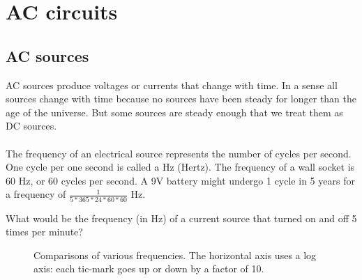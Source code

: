 \chapter{AC circuits}

\section{AC sources}
AC sources produce voltages or currents that change with time. In a sense all sources change with time because no sources have been steady for longer than the age of the universe. But some sources are steady enough that we treat them as DC sources.\\
\\
The frequency of an electrical source represents the number of cycles per second. One cycle per one second is called a Hz (Hertz). The frequency of a wall socket is 60 Hz, or 60 cycles per second. A 9V battery might undergo 1 cycle in 5 years for a frequency of $\frac{1}{5*365*24*60*60}$ Hz. \\

\begin{alevel}
What would be the frequency (in Hz) of a current source that turned on and off 5 times per minute?
\end{alevel}

\begin{figure}[H]
\begin{center}
\caption{Comparisons of various frequencies. The horizontal axis uses a log axis: each tic-mark goes up or down by a factor of 10.}
\end{center}
\end{figure}


